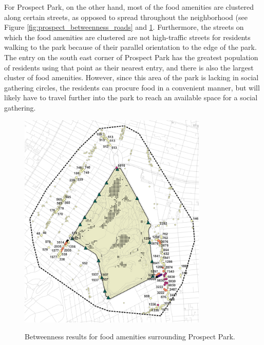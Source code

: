 \begin{multicols}{2}
For Prospect Park, on the other hand, most of the food amenities are clustered along certain streets, as opposed to spread throughout the neighborhood (see Figure \ref{fig:prospect_betweenness_roads} and \ref{fig:prospect_betweenness_food}. Furthermore, the streets on which the food amenities are clustered are not high-traffic streets for residents walking to the park because of their parallel orientation to the edge of the park. The entry on the south east corner of Prospect Park has the greatest population of residents using that point as their nearest entry, and there is also the largest cluster of food amenities. However, since this area of the park is lacking in social gathering circles, the residents can procure food in a convenient manner, but will likely have to travel further into the park to reach an available space for a social gathering. 

\end{multicols}

\begin{figure}[H]
  \centering
  \captionsetup{width=0.8\textwidth}
  \includegraphics[width=0.8\textwidth]{images/network/prospect_betweenness_food.png} \\
  \vspace{10pt}
  \caption[Prospect Park - betweenness]{Betweenness results for food amenities surrounding Prospect Park.}
  \label{fig:prospect_betweenness_food}
\end{figure}

